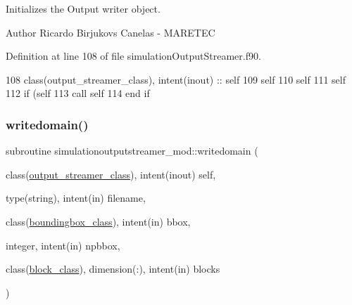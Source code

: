Initializes the Output writer object. 

\begin{DoxyAuthor}{Author}
Ricardo Birjukovs Canelas -\/ M\+A\+R\+E\+T\+EC 
\end{DoxyAuthor}


Definition at line 108 of file simulation\+Output\+Streamer.\+f90.


\begin{DoxyCode}
108     \textcolor{keywordtype}{class}(output\_streamer\_class), \textcolor{keywordtype}{intent(inout)} :: self
109     self%
110     self%
111     self%
112     \textcolor{keywordflow}{if} (self%
113         \textcolor{keyword}{call }self%
114 \textcolor{keywordflow}{    end if}
\end{DoxyCode}
\mbox{\label{namespacesimulationoutputstreamer__mod_a2c660b4331c576befebcf037b82b8d7a}} 
\subsubsection{\texorpdfstring{writedomain()}{writedomain()}}
{\footnotesize\ttfamily subroutine simulationoutputstreamer\+\_\+mod\+::writedomain (\begin{DoxyParamCaption}\item[{class(\mbox{\hyperlink{structsimulationoutputstreamer__mod_1_1output__streamer__class}{output\+\_\+streamer\+\_\+class}}), intent(inout)}]{self,  }\item[{type(string), intent(in)}]{filename,  }\item[{class(\mbox{\hyperlink{structboundingbox__mod_1_1boundingbox__class}{boundingbox\+\_\+class}}), intent(in)}]{bbox,  }\item[{integer, intent(in)}]{npbbox,  }\item[{class(\mbox{\hyperlink{structblocks__mod_1_1block__class}{block\+\_\+class}}), dimension(\+:), intent(in)}]{blocks }\end{DoxyParamCaption})\hspace{0.3cm}{\ttfamily [private]}}



